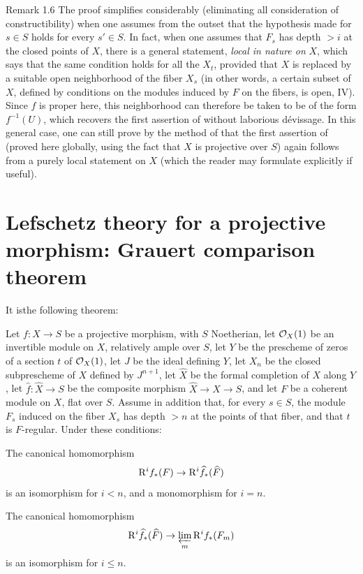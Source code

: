 \label{XII.1.6}
\begin{enonce*}[remark]{Remark 1.6\sfootnotemark}  The proof simplifies considerably (eliminating all consideration of constructibility) when one assumes from the outset that the hypothesis made for $s\in S$ holds for every $s'\in S$. In fact, when one assumes that $F_s$ has depth $>i$ at the closed points of $X$, there is a general statement, \emph{local in nature on} $X$, which says that the same condition holds for all the $X_t$, provided that $X$ is replaced by a suitable open neighborhood of the fiber $X_s$ (in other words, a certain subset of $X$, defined by conditions on the modules induced by $F$ on the fibers, is open, \cf \EGA IV). Since $f$ is proper here, this neighborhood can therefore be taken to be of the form $f^{-1}(U)$, which recovers the first assertion of  without laborious d\'evissage. In this general case, one can still prove by the method of \loccit that the first assertion of  (proved here globally, using the fact that $X$ is projective over $S$) again follows from a purely local statement on $X$ (which the reader may formulate explicitly if useful).
\end{enonce*}

\section[Lefschetz theory for a projective morphism: comparison]
{Lefschetz theory for a projective morphism: Grauert comparison theorem} \label{XII.2}

\setcounter{equation}{13}
It is\pageoriginale the following theorem:

\begin{theoreme} \label{XII.2.1}
Let $f:X\to S$ be a projective morphism, with $S$ Noetherian, let $\mathcal O_X(1)$ be an invertible module on $X$, relatively ample over $S$, let $Y$ be the prescheme of zeros of a section $t$ of $\mathcal O_X(1)$, let $J$ be the ideal defining $Y$, let $X_n$ be the closed subprescheme of $X$ defined by $J^{n+1}$, let $\widehat{X}$ be the formal completion of $X$ along $Y$, let $\widehat{f}:\widehat{X}\to S$ be the composite morphism $\widehat{X}\to X\to S$, and let $F$ be a coherent module on $X$, flat over $S$. Assume in addition that, for every $s\in S$, the module $F_s$ induced on the fiber $X_s$ has depth $>n$ at the points of that fiber, and that $t$ is $F$-regular. Under these conditions:
\begin{enumeratei}
\item
The canonical homomorphism
\[
\mathrm R^if_\ast(F) \to \mathrm R^i\widehat{f}_\ast(\widehat{F})
\]
is an isomorphism for $i<n$, and a monomorphism for $i=n$.
\item
The canonical homomorphism
\[
\mathrm R^i\widehat{f}_\ast(\widehat{F}) \to \varprojlim_m \mathrm R^if_\ast(F_m)
\]
is an isomorphism for $i\leq n$.
\end{enumeratei}
\end{theoreme}

